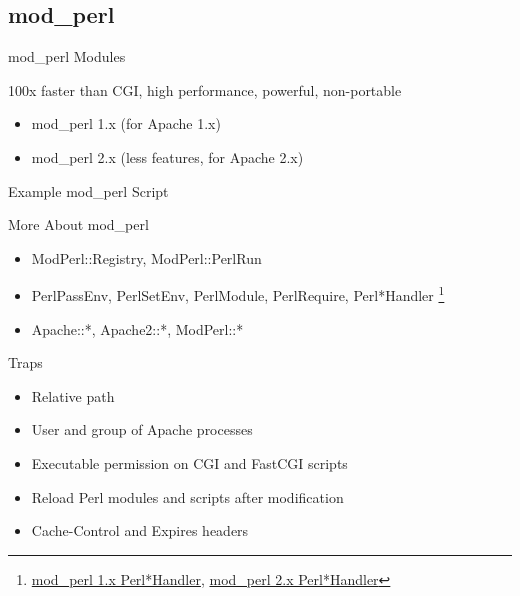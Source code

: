 \documentclass{beamer}
\begin{document}
\subsection{mod\_perl}

\begin{frame}{mod\_perl Modules}
  \begin{center}
100x faster than CGI, high performance, powerful, non-portable
  \end{center}
  \begin{itemize}
    \item mod\_perl 1.x (for Apache 1.x)
    \item mod\_perl 2.x (less features, for Apache 2.x)
  \end{itemize}
\end{frame}

\begin{frame}[containsverbatim]{Example mod\_perl Script}

\end{frame}

\begin{frame}{More About mod\_perl}
  \begin{itemize}
    \item ModPerl::Registry, ModPerl::PerlRun
    \item PerlPassEnv, PerlSetEnv, PerlModule, PerlRequire, Perl*Handler
          \footnote{\tiny
                \href{http://perl.apache.org/docs/1.0/guide/config.html\#Perl\_Handlers}{mod\_perl 1.x Perl*Handler},
                \href{http://perl.apache.org/docs/2.0/user/config/config.html\#HTTP\_Protocol\_Handlers\_Directives}{mod\_perl 2.x Perl*Handler}}
    \item Apache::*, Apache2::*, ModPerl::*
  \end{itemize}
\end{frame}

\begin{frame}{Traps}
  \begin{itemize}
    \item Relative path
    \item User and group of Apache processes
    \item Executable permission on CGI and FastCGI scripts
    \item Reload Perl modules and scripts after modification
    \item Cache-Control and Expires headers
  \end{itemize}
\end{frame}
\end{document}
